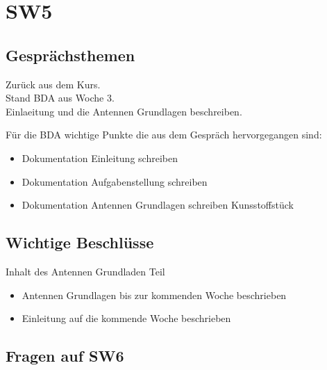 \documentclass[10pt,a4paper]{article}
\begin{document}
\section*{SW5}

\subsection*{Gesprächsthemen}

Zurück aus dem Kurs. \\
Stand BDA aus Woche 3.\\
Einlaeitung und die Antennen Grundlagen beschreiben.


\vspace{10 mm}
Für die BDA wichtige Punkte die aus dem Gespräch hervorgegangen sind:
\begin{itemize}
	\item Dokumentation Einleitung schreiben
	\item Dokumentation Aufgabenstellung schreiben
	\item Dokumentation Antennen Grundlagen schreiben
 Kunsstoffstück

\end{itemize}

\subsection*{Wichtige Beschlüsse}
Inhalt des Antennen Grundladen Teil
\begin{itemize}
	\item Antennen Grundlagen bis zur kommenden Woche beschrieben
	\item Einleitung auf die kommende Woche beschrieben

\end{itemize}

\subsection*{Fragen auf SW6}
\end{document}
